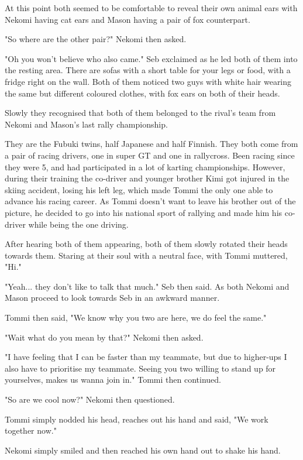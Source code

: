 At this point both seemed to be comfortable to reveal their own animal ears with Nekomi having cat ears and Mason having a pair of fox counterpart. 

"So where are the other pair?" Nekomi then asked. 

"Oh you won't believe who also came." Seb exclaimed as he led both of them into the resting area. 
There are sofas with a short table for your legs or food, with a fridge right on the wall. 
Both of them noticed two guys with white hair wearing the same but different coloured clothes, with fox ears on both of their heads. 

Slowly they recognised that both of them belonged to the rival's team from Nekomi and Mason's last rally championship. 

They are the Fubuki twins, half Japanese and half Finnish. 
They both come from a pair of racing drivers, one in super GT and one in rallycross. 
Been racing since they were 5, and had participated in a lot of karting championships. 
However, during their training the co-driver and younger brother Kimi got injured in the skiing accident, losing his left leg, which made Tommi the only one able to advance his racing career. 
As Tommi doesn't want to leave his brother out of the picture, he decided to go into his national sport of rallying and made him his co-driver while being the one driving. 

After hearing both of them appearing, both of them slowly rotated their heads towards them. 
Staring at their soul with a neutral face, with Tommi muttered, "Hi."

"Yeah... they don't like to talk that much." Seb then said. As both Nekomi and Mason proceed to look towards Seb in an awkward manner. 

Tommi then said, "We know why you two are here, we do feel the same."

"Wait what do you mean by that?" Nekomi then asked. 

"I have feeling that I can be faster than my teammate, but due to higher-ups I also have to prioritise my teammate. Seeing you two willing to stand up for yourselves, makes us wanna join in." Tommi then continued. 

"So are we cool now?" Nekomi then questioned. 

Tommi simply nodded his head, reaches out his hand and said, "We work together now."

Nekomi simply smiled and then reached his own hand out to shake his hand. 

